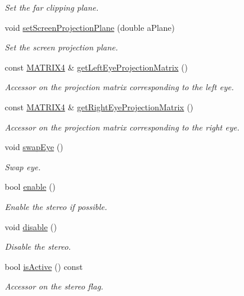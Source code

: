 \begin{DoxyCompactItemize}
\begin{DoxyCompactList}\small\item\em Set the far clipping plane. \end{DoxyCompactList}\item 
void \hyperlink{class_graphics_1_1_stereo_helper_a219235f12aa3391406fe63cd5576e0b6}{setScreenProjectionPlane} (double aPlane)
\begin{DoxyCompactList}\small\item\em Set the screen projection plane. \end{DoxyCompactList}\item 
const \hyperlink{class_math_1_1_matrix4x4}{MATRIX4} \& \hyperlink{class_graphics_1_1_stereo_helper_a83b299d08edc918b625f24389344518d}{getLeftEyeProjectionMatrix} ()
\begin{DoxyCompactList}\small\item\em Accessor on the projection matrix corresponding to the left eye. \end{DoxyCompactList}\item 
const \hyperlink{class_math_1_1_matrix4x4}{MATRIX4} \& \hyperlink{class_graphics_1_1_stereo_helper_a3f099ee2d19cf7dd794cdc52297b7e34}{getRightEyeProjectionMatrix} ()
\begin{DoxyCompactList}\small\item\em Accessor on the projection matrix corresponding to the right eye. \end{DoxyCompactList}\item 
void \hyperlink{class_graphics_1_1_stereo_helper_a3fd807eb117ce72ef569c2e5fb1dbfbe}{swapEye} ()
\begin{DoxyCompactList}\small\item\em Swap eye. \end{DoxyCompactList}\item 
bool \hyperlink{class_graphics_1_1_stereo_helper_ac4d54917c650bb098dd0247d1ec058fa}{enable} ()
\begin{DoxyCompactList}\small\item\em Enable the stereo if possible. \end{DoxyCompactList}\item 
void \hyperlink{class_graphics_1_1_stereo_helper_a64356f4ad22021f35ed9e0078adbd543}{disable} ()
\begin{DoxyCompactList}\small\item\em Disable the stereo. \end{DoxyCompactList}\item 
bool \hyperlink{class_graphics_1_1_stereo_helper_a1a822c8ed8db21db0805ab1ab622c6c2}{isActive} () const 
\begin{DoxyCompactList}\small\item\em Accessor on the stereo flag. \end{DoxyCompactList}\end{DoxyCompactItemize}
